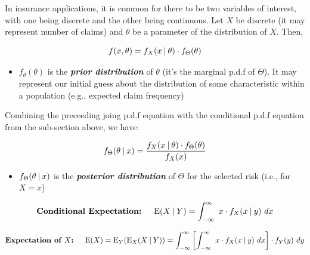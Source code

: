 \documentclass[
]{article}
\providecommand{\tightlist}{%
  \setlength{\itemsep}{0pt}\setlength{\parskip}{0pt}}
\begin{document}
\begin{green}

In insurance applications, it is common for there to be two variables of
interest, with one being discrete and the other being continuous. Let
\(X\) be discrete (it may represent number of claims) and \(\theta\) be
a parameter of the distribution of \(X\). Then,

\[
  f(x,\theta) = f_X(x \:\vert\: \theta) \cdot f_\Theta(\theta)
\]

\begin{itemize}
\tightlist
\item
  \(f_\theta(\theta)\) is the \textbf{\emph{prior distribution}} of
  \(\theta\) (it's the marginal p.d.f of \(\Theta\)). It may represent
  our initial guess about the distribution of some characteristic within
  a population (e.g., expected claim frequency)
\end{itemize}

\end{green}

\begin{green}

Combining the preceeding joing p.d.f equation with the conditional p.d.f
equation from the sub-section above, we have:

\[
  f_\Theta(\theta \:\vert\: x) = \dfrac{f_X(x \:\vert\: \theta) \cdot f_\Theta(\theta)}{f_X(x)}
\]

\begin{itemize}
\tightlist
\item
  \(f_\Theta(\theta \:\vert\: x)\) is the \textbf{\emph{posterior
  distribution}} of \(\Theta\) for the selected risk (i.e., for
  \(X = x\))
\end{itemize}

\end{green}

\begin{yellow}

\[
  \textbf{Conditional Expectation: } \quad \text{E}(X \given Y) = \int_{-\infty}^\infty \ x \cdot f_X(x \given y) \ dx
\]

\end{yellow}

\begin{yellow}

\[
  \textbf{Expectation of } X \textbf{: } \quad \text{E}(X) = \text{E}_Y(\text{E}_X(X \:\vert\: Y)) = \int_{-\infty}^\infty \left[ \int_{-\infty}^\infty  \ x \cdot f_X(x \:\vert\: y) \ dx \right] \cdot f_Y(y) \ dy
\]

\end{yellow}
\end{document}
